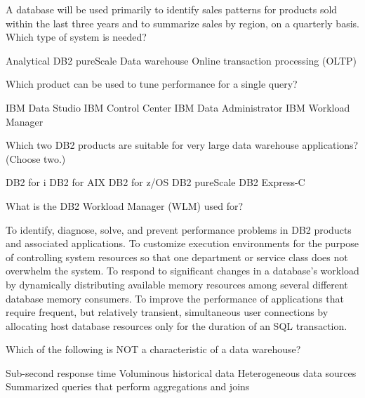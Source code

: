 \documentclass[11pt]{exam}
\begin{document}
\begin{questions}


\addpoints
\question[1]
A database will be used primarily to identify sales patterns
for products sold within the last three years and to summarize
sales by region, on a quarterly basis. Which type of system is 
needed?
\begin{choices}
\choice Analytical
\choice DB2 pureScale
\choice Data warehouse
\choice Online transaction processing (OLTP)
\end{choices}

\question[1]
Which product can be used to tune performance for a single query?
\begin{choices}
\choice IBM Data Studio
\choice IBM Control Center
\choice IBM Data Administrator
\choice IBM Workload Manager
\end{choices}

\question[1]
Which two DB2 products are suitable for very large data warehouse applications? (Choose two.)
\begin{choices}
\choice DB2 for i
\choice DB2 for AIX
\choice DB2 for z/OS
\choice DB2 pureScale
\choice DB2 Express-C
\end{choices}

\question[1]
What is the DB2 Workload Manager (WLM) used for?
\begin{choices}
\choice To identify, diagnose, solve, and prevent performance problems in DB2 products and associated applications.
\choice To customize execution environments for the purpose of controlling system resources so that one
		department or service class does not overwhelm the system.
\choice To respond to significant changes in a database's workload by dynamically distributing available memory resources
		among several different database memory consumers.
\choice To improve the performance of applications that require frequent, but relatively transient, simultaneous user
		connections by allocating host database resources only for the duration of an SQL transaction.
\end{choices}

\question[1]
Which of the following is NOT a characteristic of a data warehouse?
\begin{choices}
\choice Sub-second response time
\choice Voluminous historical data
\choice Heterogeneous data sources
\choice Summarized queries that perform aggregations and joins
\end{choices}


\end{questions}
\end{document}
